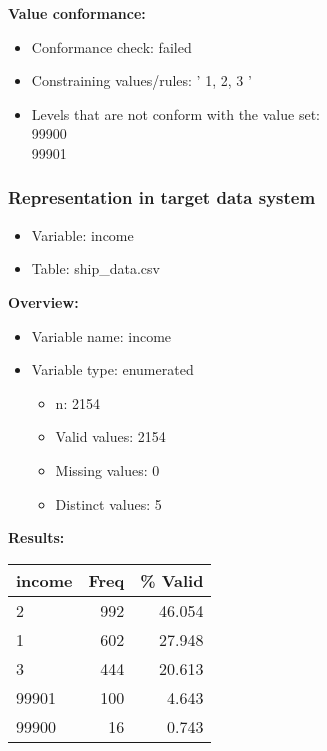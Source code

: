 \documentclass[
]{article}
\providecommand{\tightlist}{%
  \setlength{\itemsep}{0pt}\setlength{\parskip}{0pt}}
\begin{document}
\textbf{Value conformance:}

\begin{itemize}
\tightlist
\item
  Conformance check: failed
\item
  Constraining values/rules: ' 1, 2, 3 '
\item
  Levels that are not conform with the value set:\\
  99900\\
  99901
\end{itemize}

\newpage

\hypertarget{representation-in-target-data-system-15}{%
\subsubsection{\texorpdfstring{Representation in \textbf{target} data
system}{Representation in target data system}}\label{representation-in-target-data-system-15}}

\begin{itemize}
\tightlist
\item
  Variable: income
\item
  Table: ship\_data.csv
\end{itemize}

\textbf{Overview:}

\begin{itemize}
\tightlist
\item
  Variable name: income
\item
  Variable type: enumerated

  \begin{itemize}
  \tightlist
  \item
    n: 2154
  \item
    Valid values: 2154
  \item
    Missing values: 0
  \item
    Distinct values: 5
  \end{itemize}
\end{itemize}

\textbf{Results:}\\

\begin{table}[H]
\centering
\begin{tabular}{l|r|r}
\hline
\textbf{income} & \textbf{Freq} & \textbf{\% Valid}\\
\hline
2 & 992 & 46.054\\
\hline
1 & 602 & 27.948\\
\hline
3 & 444 & 20.613\\
\hline
99901 & 100 & 4.643\\
\hline
99900 & 16 & 0.743\\
\hline
\end{tabular}
\end{table}
\end{document}
